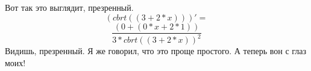 \documentclass[a4paper,12pt]{article}
\begin{document}
Вот так это выглядит, презренный.
\begin{equation}
\left( cbrt \left( {\left( {3 }+ {{2 }* {x }}\right) }\right) \right)' =
\end{equation}
\begin{equation}
\frac{{\left( {0 }+ {\left( {{0 }* {x }}+ {{2 }* {1 }}\right) }\right) }}{{{3 }* {{cbrt \left( {\left( {3 }+ {{2 }* {x }}\right) }\right) }^ {2 }}}}
\end{equation}
Видишь, презренный. Я же говорил, что это проще простого.
А теперь вон с глаз моих!
\end{document}

